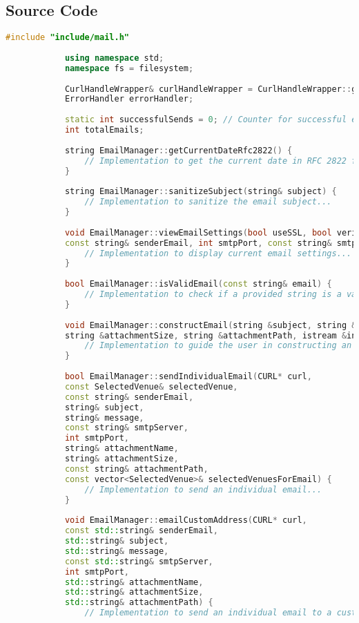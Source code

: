 \documentclass{article}
\begin{document}
	\subsection*{Source Code}
	\begin{mdframed}[backgroundcolor=background, hidealllines=false, innerleftmargin=15pt, innerrightmargin=5pt, innertopmargin=0pt, innerbottommargin=-5pt]
		\begin{lstlisting}[language=C++]
			#include "include/mail.h"
			
			using namespace std;
			namespace fs = filesystem;
			
			CurlHandleWrapper& curlHandleWrapper = CurlHandleWrapper::getInstance();
			ErrorHandler errorHandler;
			
			static int successfulSends = 0; // Counter for successful email sends
			int totalEmails;
			
			string EmailManager::getCurrentDateRfc2822() {
				// Implementation to get the current date in RFC 2822 format...
			}
			
			string EmailManager::sanitizeSubject(string& subject) {
				// Implementation to sanitize the email subject...
			}
			
			void EmailManager::viewEmailSettings(bool useSSL, bool verifyPeer, bool verifyHost, bool verbose,
			const string& senderEmail, int smtpPort, const string& smtpServer) {
				// Implementation to display current email settings...
			}
			
			bool EmailManager::isValidEmail(const string& email) {
				// Implementation to check if a provided string is a valid email format...
			}
			
			void EmailManager::constructEmail(string &subject, string &message, string &attachmentName, 
			string &attachmentSize, string &attachmentPath, istream &in) {
				// Implementation to guide the user in constructing an email...
			}
			
			bool EmailManager::sendIndividualEmail(CURL* curl,
			const SelectedVenue& selectedVenue,
			const string& senderEmail,
			string& subject,
			string& message,
			const string& smtpServer,
			int smtpPort,
			string& attachmentName,
			string& attachmentSize,
			const string& attachmentPath,
			const vector<SelectedVenue>& selectedVenuesForEmail) {
				// Implementation to send an individual email...
			}
		
			void EmailManager::emailCustomAddress(CURL* curl,
			const std::string& senderEmail,
			std::string& subject,
			std::string& message,
			const std::string& smtpServer,
			int smtpPort,
			std::string& attachmentName,
			std::string& attachmentSize,
			std::string& attachmentPath) {
				// Implementation to send an individual email to a custom address...
							
		\end{lstlisting}
	\end{mdframed}
	
\end{document}
